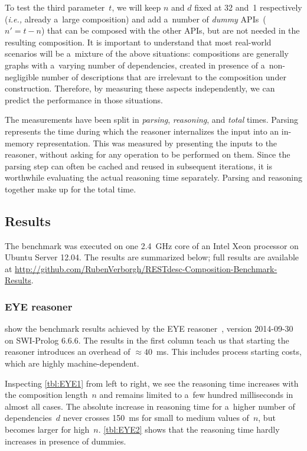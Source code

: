 To test the third parameter~$t$,
we will keep $n$ and $d$ fixed at 32 and~1 respectively
(\textit{i.e.,} already a~large composition)
and add a~number of \emph{dummy} APIs~($n'=t-n$) that can be composed with the other APIs,
but are not needed in the resulting composition.
It is important to understand that most real-world scenarios will be a~mixture
of the above situations:
compositions are generally graphs with a~varying number of dependencies,
created in presence of a~non-negligible number of descriptions that are irrelevant to the composition under construction.
Therefore, by measuring these aspects independently,
we can predict the performance in those situations.

The measurements have been split in
\emph{parsing}, \emph{reasoning}, and \emph{total} times.
Parsing represents the time during which the reasoner internalizes the input
into an in-memory representation.
This was measured by presenting the inputs to the reasoner,
without asking for any operation to be performed on them.
Since the parsing step can often be cached and reused in subsequent iterations,
it is worthwhile evaluating the actual reasoning time separately.
Parsing and reasoning together make up for the total time.

\subsection{Results}

The benchmark was executed on one 2.4~GHz core of an Intel Xeon processor
on Ubuntu Server 12.04.
The results are summarized below;
full results are available
at \url{http://github.com/RubenVerborgh/RESTdesc-Composition-Benchmark-Results}.

\subsubsection{EYE reasoner}
 show the benchmark results achieved by the EYE reasoner~\cite{eyepaper},
version 2014-09-30 on SWI-Prolog 6.6.6.
The results in the first column teach us that
starting the reasoner introduces an overhead of $\approx 40$~ms.
This includes process starting costs, which are highly machine-dependent.

Inspecting \cref{tbl:EYE1} from left to right,
we see the reasoning time increases with the composition length~$n$
and remains limited to a~few hundred milliseconds in almost all cases.
The absolute increase in reasoning time for a~higher number of dependencies~$d$
never crosses 150~ms for small to medium values of~$n$,
but becomes larger for high~$n$.
\cref{tbl:EYE2} shows that the reasoning time hardly increases in presence of dummies.


